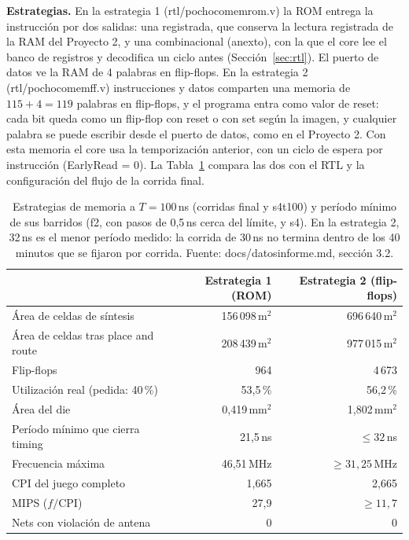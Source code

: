 \documentclass[11pt,a4paper]{article}
\DeclareRobustCommand{\sig}[1]{{\ttfamily\def\_{\textunderscore\allowbreak}#1}}
\newcommand{\umd}{\,\textmu m$^2$\xspace}
\newcommand{\mmd}{\,mm$^2$\xspace}
\begin{document}
\textbf{Estrategias.} En la estrategia 1 (\sig{rtl/pochoco\_mem\_rom.v}) la ROM entrega la instrucción por dos salidas: una registrada, que conserva la lectura registrada de la RAM del Proyecto 2, y una combinacional (\sig{a\_next\_o}), con la que el core lee el banco de registros y decodifica un ciclo antes (Sección~\ref{sec:rtl}). El puerto de datos ve la RAM de 4 palabras en flip-flops. En la estrategia 2 (\sig{rtl/pochoco\_mem\_ff.v}) instrucciones y datos comparten una memoria de $115 + 4 = 119$ palabras en flip-flops, y el programa entra como valor de reset: cada bit queda como un flip-flop con reset o con set según la imagen, y cualquier palabra se puede escribir desde el puerto de datos, como en el Proyecto 2. Con esta memoria el core usa la temporización anterior, con un ciclo de espera por instrucción (\sig{EarlyRead = 0}). La Tabla~\ref{tab:estrategias} compara las dos con el RTL y la configuración del flujo de la corrida final.

\begin{table}[!htb]
\centering\small
\begin{tabular}{@{}lrr@{}}
\toprule
 & \textbf{Estrategia 1 (ROM)} & \textbf{Estrategia 2 (flip-flops)} \\
\midrule
Área de celdas de síntesis & 156\,098\umd & 696\,640\umd \\
Área de celdas tras place and route & 208\,439\umd & 977\,015\umd \\
Flip-flops & 964 & 4\,673 \\
Utilización real (pedida: 40\,\%) & 53,5\,\% & 56,2\,\% \\
Área del die & 0,419\mmd & 1,802\mmd \\
Período mínimo que cierra timing & 21,5\,ns & $\leq 32$\,ns \\
Frecuencia máxima & 46,51\,MHz & $\geq 31{,}25$\,MHz \\
CPI del juego completo & 1,665 & 2,665 \\
MIPS ($f/\text{CPI}$) & 27,9 & $\geq 11{,}7$ \\
Nets con violación de antena & 0 & 0 \\
\bottomrule
\end{tabular}
\caption{Estrategias de memoria a $T = 100$\,ns (corridas \sig{final} y \sig{s4\_t100}) y período mínimo de sus barridos (\sig{f2\_*}, con pasos de 0,5\,ns cerca del límite, y \sig{s4\_*}). En la estrategia 2, 32\,ns es el menor período medido: la corrida de 30\,ns no termina dentro de los 40 minutos que se fijaron por corrida. Fuente: \sig{docs/datos\_informe.md}, sección 3.2.}
\label{tab:estrategias}
\end{table}
\end{document}
